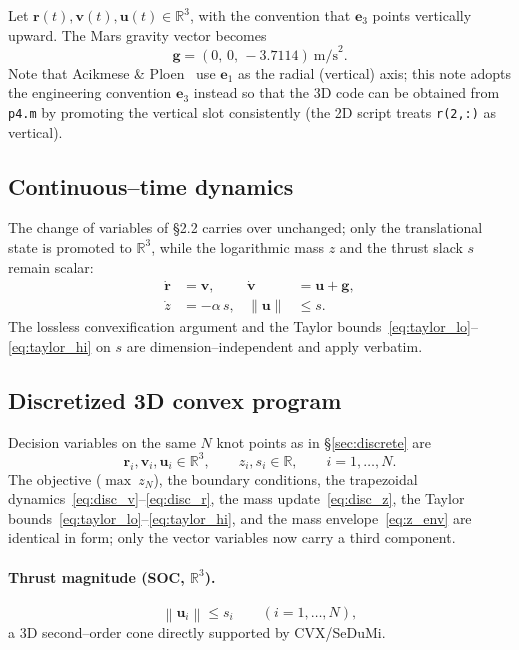 \documentclass[11pt]{article}
\newcommand{\norm}[1]{\left\|#1\right\|}
\newcommand{\bv}[1]{\bm{#1}}
\begin{document}
Let $\bv r(t),\bv v(t),\bv u(t)\in\mathbb{R}^3$, with the
convention that $\bv e_3$ points vertically upward.  The Mars
gravity vector becomes
\begin{equation}
\bv g = (0,\,0,\,-3.7114)\ \text{m/s}^2 .
\end{equation}
Note that Acikmese \& Ploen~\cite{Acikmese2007} use $\bv e_1$ as
the radial (vertical) axis; this note adopts the engineering
convention $\bv e_3$ instead so that the 3D code can be obtained
from \texttt{p4.m} by promoting the vertical slot consistently
(the 2D script treats \texttt{r(2,:)} as vertical).

\subsection{Continuous--time dynamics}

The change of variables of \S2.2 carries over unchanged; only the
translational state is promoted to $\mathbb{R}^3$, while the
logarithmic mass $z$ and the thrust slack $s$ remain scalar:
\begin{align}
\dot{\bv r} &= \bv v, &
\dot{\bv v} &= \bv u + \bv g, \\
\dot z      &= -\alpha\,s, &
\norm{\bv u} &\le s .
\end{align}
The lossless convexification argument and the Taylor
bounds~\eqref{eq:taylor_lo}--\eqref{eq:taylor_hi} on $s$ are
dimension--independent and apply verbatim.

\subsection{Discretized 3D convex program}

Decision variables on the same $N$ knot points as in
\S\ref{sec:discrete} are
\[
\bv r_i,\bv v_i,\bv u_i\in\mathbb{R}^3,\qquad
z_i,s_i\in\mathbb{R},\qquad i=1,\dots,N.
\]
The objective ($\max\ z_N$), the boundary conditions, the
trapezoidal dynamics~\eqref{eq:disc_v}--\eqref{eq:disc_r}, the
mass update~\eqref{eq:disc_z}, the Taylor
bounds~\eqref{eq:taylor_lo}--\eqref{eq:taylor_hi}, and the mass
envelope~\eqref{eq:z_env} are identical in form; only the
vector variables now carry a third component.

\paragraph{Thrust magnitude (SOC, $\mathbb{R}^3$).}
\begin{equation}
\norm{\bv u_i}\le s_i\qquad(i=1,\dots,N),
\end{equation}
a 3D second--order cone directly supported by CVX/SeDuMi.
\end{document}
